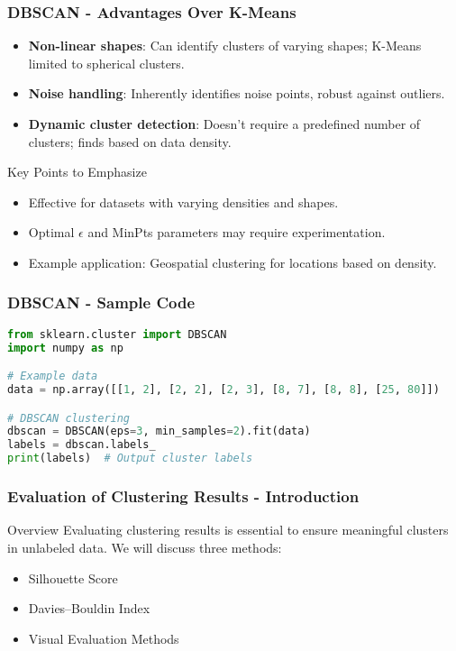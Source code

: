 \documentclass[aspectratio=169]{beamer}
\begin{document}
\begin{frame}[fragile]
    \frametitle{DBSCAN - Advantages Over K-Means}
    \begin{itemize}
        \item \textbf{Non-linear shapes}: Can identify clusters of varying shapes; K-Means limited to spherical clusters.
        \item \textbf{Noise handling}: Inherently identifies noise points, robust against outliers.
        \item \textbf{Dynamic cluster detection}: Doesn't require a predefined number of clusters; finds based on data density.
    \end{itemize}
    
    \begin{block}{Key Points to Emphasize}
        \begin{itemize}
            \item Effective for datasets with varying densities and shapes.
            \item Optimal $\epsilon$ and MinPts parameters may require experimentation.
            \item Example application: Geospatial clustering for locations based on density.
        \end{itemize}
    \end{block}
\end{frame}

\begin{frame}[fragile]
    \frametitle{DBSCAN - Sample Code}
    \begin{lstlisting}[language=Python]
from sklearn.cluster import DBSCAN
import numpy as np

# Example data
data = np.array([[1, 2], [2, 2], [2, 3], [8, 7], [8, 8], [25, 80]])

# DBSCAN clustering
dbscan = DBSCAN(eps=3, min_samples=2).fit(data)
labels = dbscan.labels_
print(labels)  # Output cluster labels
    \end{lstlisting}
\end{frame}

\begin{frame}[fragile]
    \frametitle{Evaluation of Clustering Results - Introduction}
    \begin{block}{Overview}
        Evaluating clustering results is essential to ensure meaningful clusters in unlabeled data. We will discuss three methods:
    \end{block}
    \begin{itemize}
        \item Silhouette Score
        \item Davies–Bouldin Index
        \item Visual Evaluation Methods
    \end{itemize}
\end{frame}
\end{document}
